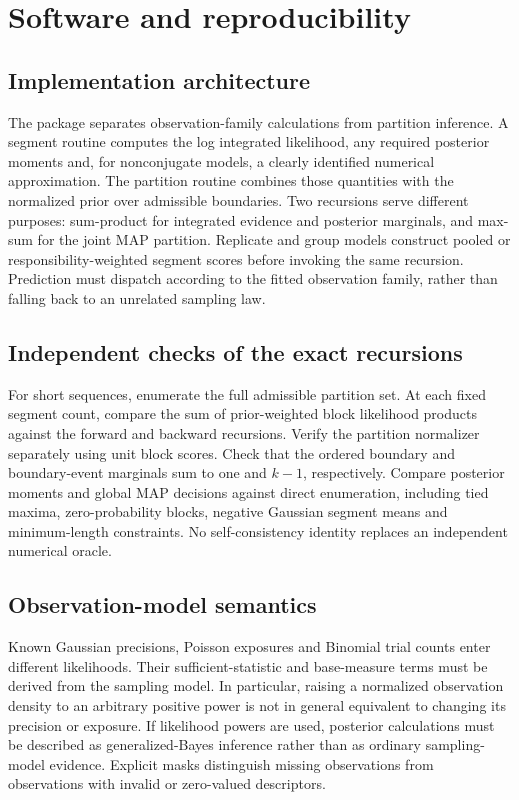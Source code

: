 \chapter{Software and reproducibility}
\label{ch:software}

\section{Implementation architecture}
The package separates observation-family calculations from partition inference. A segment routine
computes the log integrated likelihood, any required posterior moments and, for nonconjugate
models, a clearly identified numerical approximation. The partition routine combines those
quantities with the normalized prior over admissible boundaries. Two recursions serve different
purposes: sum-product for integrated evidence and posterior marginals, and max-sum for the joint
MAP partition. Replicate and group models construct pooled or responsibility-weighted segment
scores before invoking the same recursion. Prediction must dispatch according to the fitted
observation family, rather than falling back to an unrelated sampling law.



\section{Independent checks of the exact recursions}
For short sequences, enumerate the full admissible partition set. At each fixed segment count,
compare the sum of prior-weighted block likelihood products against the forward and backward
recursions. Verify the partition normalizer separately using unit block scores. Check that the
ordered boundary and boundary-event marginals sum to one and $k-1$, respectively. Compare
posterior moments and global MAP decisions against direct enumeration, including tied maxima,
zero-probability blocks, negative Gaussian segment means and minimum-length constraints.
No self-consistency identity replaces an independent numerical oracle.

\section{Observation-model semantics}
Known Gaussian precisions, Poisson exposures and Binomial trial counts enter different likelihoods.
Their sufficient-statistic and base-measure terms must be derived from the sampling model. In
particular, raising a normalized observation density to an arbitrary positive power is not in
general equivalent to changing its precision or exposure. If likelihood powers are used,
posterior calculations must be described as generalized-Bayes inference rather than as ordinary
sampling-model evidence. Explicit masks distinguish missing observations from observations with
invalid or zero-valued descriptors.

